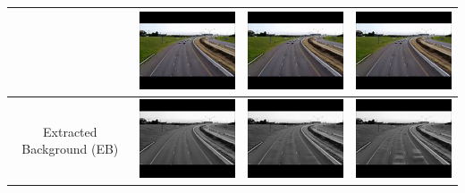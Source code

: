 \documentclass[11pt]{scrartcl} %
\theoremstyle{plain}
\begin{document}
\begin{minipage}{\linewidth}
\begin{tabular}{ | c | m{2.8cm} | m{2.8cm} | m{2.8cm} | }
	&
    \begin{minipage}{.3\textwidth}
      \includegraphics[width=\linewidth, width=25mm]{figures_video/traffic/background.png}
    \end{minipage}
	&
    \begin{minipage}{.3\textwidth}
      \includegraphics[width=\linewidth, width=25mm]{figures_video/traffic/background.png}
    \end{minipage}
    &
    \begin{minipage}{.3\textwidth}
      \includegraphics[width=\linewidth, width=25mm]{figures_video/traffic/background.png}
    \end{minipage}
	\\[5ex] \hline
	
	Extracted Background (EB)
	&
    \begin{minipage}{.3\textwidth}
      \includegraphics[width=\linewidth, width=25mm]{figures_video/traffic/rpca/lowRank_0.png}
    \end{minipage}	
	&
    \begin{minipage}{.3\textwidth}
      \includegraphics[width=\linewidth, width=25mm]{figures_video/traffic/pca/lowRank_0.png}
    \end{minipage}
	&
    \begin{minipage}{.3\textwidth}
      \includegraphics[width=\linewidth, width=25mm]{figures_video/traffic/pca2/lowRank_0.png}
    \end{minipage}
	\\[6ex] \hline
	

\end{tabular}
\end{minipage}
\end{document}
